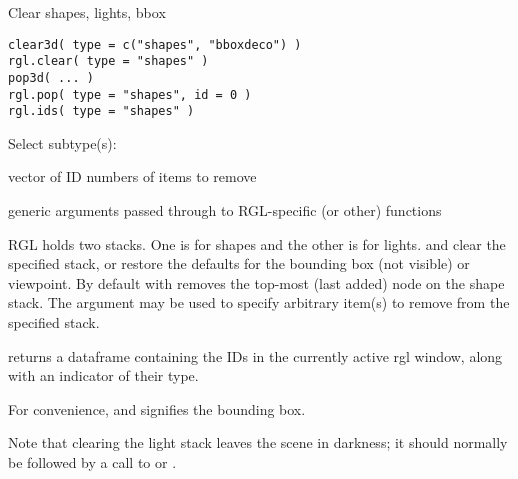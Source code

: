 \begin{Description}\relax
Clear shapes, lights, bbox
\end{Description}
\begin{Usage}
\begin{verbatim}
clear3d( type = c("shapes", "bboxdeco") ) 
rgl.clear( type = "shapes" )
pop3d( ... )
rgl.pop( type = "shapes", id = 0 )  
rgl.ids( type = "shapes" )
\end{verbatim}
\end{Usage}
\begin{Arguments}
\begin{ldescription}
\item[\code{type}] Select subtype(s):

\item[\code{id}] vector of ID numbers of items to remove
\item[\code{...}] generic arguments passed through to RGL-specific (or other) functions
\end{ldescription}
\end{Arguments}
\begin{Details}\relax
RGL holds two stacks. One is for shapes and the other is for lights. 
 and  clear the specified stack, or restore
the defaults for the bounding box (not visible) or viewpoint.  By default
with   removes 
the top-most (last added) node on the shape stack.  The  argument
may be used to specify arbitrary item(s) to remove from the specified stack.

 returns a dataframe containing the IDs in the currently active
rgl window, along with an indicator of their type.

For convenience,  and 
 signifies the bounding box.

Note that clearing the light stack leaves the scene in darkness; it should normally
be followed by a call to  or .
\end{Details}
